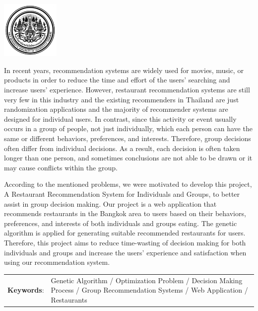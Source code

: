 \documentclass[12pt,oneside,openright,a4paper]{cpe-english-project}
\begin{document}
\pdfstringdefDisableCommands{%
\let\MakeUppercase\relax
}
\begin{center}
  \includegraphics[width=2.8cm]{logo02.jpg}
\end{center}
\vspace*{-1cm}

\maketitlepage
\makesignaturepage 

\abstract

In recent years, recommendation systems are widely used for movies, music, or products in order to reduce the time and effort of the users’ searching and increase users’ experience. However, restaurant recommendation systems are still very few in this industry and the existing recommenders in Thailand are just randomization applications and the majority of recommender systems are designed for individual users. In contrast, since this activity or event usually occurs in a group of people, not just individually, which each person can have the same or different behaviors, preferences, and interests. Therefore, group decisions often differ from individual decisions. As a result, each decision is often taken longer than one person, and sometimes conclusions are not able to be drawn or it may cause conflicts within the group.

According to the mentioned problems, we were motivated to develop this project, A Restaurant Recommendation System for Individuals and Groups, to better assist in group decision making. Our project is a web application that recommends restaurants in the Bangkok area to users based on their behaviors, preferences, and interests of both individuals and groups eating. The genetic algorithm is applied for generating suitable recommended restaurants for users. Therefore, this project aims to reduce time-wasting of decision making for both individuals and groups and increase the users’ experience and satisfaction when using our recommendation system.


\begin{flushleft}
\begin{tabular*}{\textwidth}{@{}lp{}}
\textbf{Keywords}: & Genetic Algorithm / Optimization Problem / Decision Making Process / Group Recommendation Systems / Web Application / Restaurants
\end{tabular*}
\end{flushleft}
\endabstract
\end{document}
